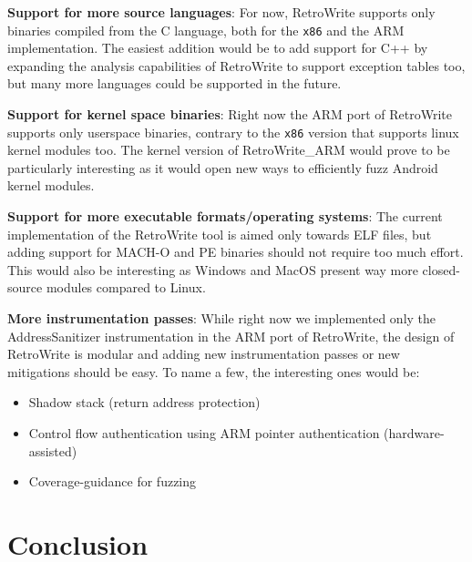 \documentclass[a4paper,11pt,oneside]{report}
\newcommand{\sysname}{RetroWrite\xspace}
\begin{document}
{

\setlength{\parindent}{0cm}
\hangindent=0.7cm \textbf{Support for more source languages}: For now, 
\sysname supports only binaries compiled from the C language, both for the 
\texttt{x86} and the ARM implementation. The easiest addition would be to add 
support for C++ by expanding the analysis capabilities of \sysname to support 
exception tables too, but many more languages could be supported in the future. 

\hangindent=0.7cm \textbf{Support for kernel space binaries}: Right now the ARM 
port of \sysname supports only userspace binaries, contrary to the 
\texttt{x86} version that supports linux kernel modules too. The kernel version 
of \sysname\_ARM would prove to be particularly interesting as it would open 
new ways to efficiently fuzz Android kernel modules.

\hangindent=0.7cm \textbf{Support for more executable formats/operating 
systems}: The current implementation of the \sysname tool is aimed only 
towards ELF files, but adding support for MACH-O and PE binaries should not 
require too much effort. This would also be interesting as Windows and MacOS 
present way more closed-source modules compared to Linux.

\hangindent=0.7cm \textbf{More instrumentation passes}: While right now we 
implemented only the AddressSanitizer instrumentation in the ARM port of
\sysname, the design of \sysname is modular and adding new instrumentation 
passes or new mitigations should be easy. To name a few, the interesting ones would be:
\begin{itemize}
	\item Shadow stack (return address protection)
	\item Control flow authentication using ARM pointer authentication 
		(hardware-assisted)
	\item Coverage-guidance for fuzzing
\end{itemize}

}

\chapter{Conclusion}
\end{document}
